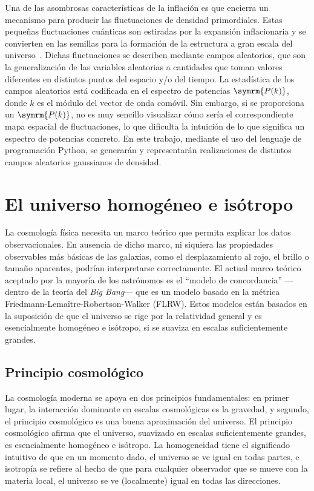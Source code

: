 Una de las asombrosas características de la inflación es que encierra un mecanismo para producir las fluctuaciones de densidad primordiales. Estas pequeñas fluctuaciones cuánticas son estiradas por la expansión inflacionaria y se convierten en las semillas para la formación de la estructura a gran escala del universo~\cite{Mukhanov1981,bardeen1983spontaneous,hawking1982development,starobinsky1982dynamics,guth1985quantum}. Dichas fluctuaciones se describen mediante campos aleatorios, que son la generalización de las variables aleatorias a cantidades que toman valores diferentes en distintos puntos del espacio y/o del tiempo. La estadística de los campos aleatorios está codificada en el espectro de potencias \(\symrm{P(k)}\), donde \(k\) es el módulo del vector de onda comóvil.
\newpage
Sin embargo, si se proporciona un \(\symrm{P(k)}\), no es muy sencillo visualizar cómo sería el correspondiente mapa espacial de fluctuaciones, lo que dificulta la intuición de lo que significa un espectro de potencias concreto. En este trabajo, mediante el uso del lenguaje de programación Python, se generarán y representarán realizaciones de distintos campos aleatorios gaussianos de densidad.
\clearpage
\section{El universo homogéneo e isótropo}\label{sec::homogeneo}
La cosmología física necesita un marco teórico que permita explicar los datos observacionales. En ausencia de dicho marco, ni siquiera las propiedades observables más básicas de las galaxias, como el desplazamiento al rojo, el brillo o tamaño aparentes, podrían interpretarse correctamente. El actual marco teórico aceptado por la mayoría de los astrónomos es el ``modelo de concordancia'' ---dentro de la teoría del \textit{Big Bang}--- que es un modelo basado en la métrica Friedmann-Lemaître-Robertson-Walker (FLRW). Estos modelos están basados en la suposición de que el universo se rige por la relatividad general y es esencialmente homogéneo e isótropo, si se suaviza en escalas suficientemente grandes.
\subsection{Principio cosmológico}
La cosmología moderna se apoya en dos principios fundamentales: en primer lugar, la interacción dominante en escalas cosmológicas es la gravedad, y segundo, el principio cosmológico es una buena aproximación del universo. El principio cosmológico afirma que el universo, suavizado en escalas suficientemente grandes, es esencialmente homogéneo e isótropo. La homogeneidad tiene el significado intuitivo de que en un momento dado, el universo se ve igual en todas partes, e isotropía se refiere al hecho de que para cualquier observador que se mueve con la materia local, el universo se ve (localmente) igual en todas las direcciones.
